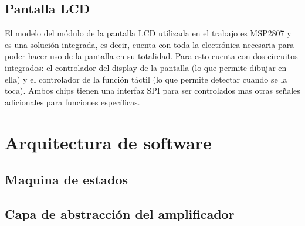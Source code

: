 \subsection{Pantalla LCD}

El modelo del módulo de la pantalla LCD utilizada en el trabajo es MSP2807 y es una solución integrada, es decir, cuenta con toda la electrónica necesaria para poder hacer uso de la pantalla en su totalidad. Para esto cuenta con dos circuitos integrados: el controlador del display de la pantalla (lo que permite dibujar en ella) y el controlador de la función táctil (lo que permite detectar cuando se la toca). Ambos chips tienen una interfaz SPI para ser controlados mas otras señales adicionales para funciones específicas.

\section{Arquitectura de software}

\subsection{Maquina de estados}

\subsection{Capa de abstracción del amplificador}


